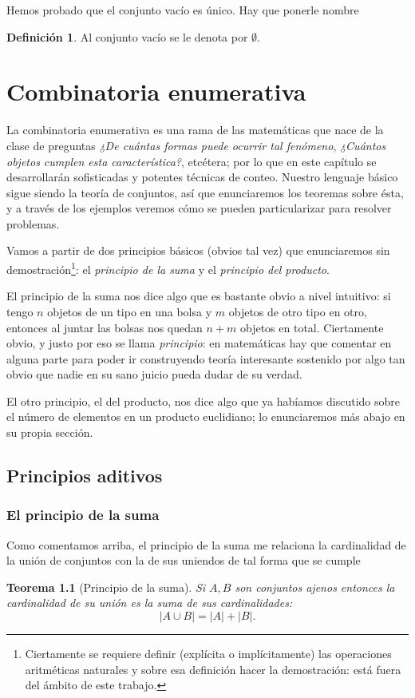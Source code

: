 \documentclass{book}
\newtheorem{thm}{Teorema}[chapter]
\theoremstyle{definition}
\newtheorem{df}{Definición}[chapter]
\begin{document}
Hemos probado que el conjunto vacío es único. Hay que ponerle nombre
\begin{df}
	Al conjunto vacío se le denota por $\emptyset$.
\end{df}

\chapter{Combinatoria enumerativa}
\label{ch_combinatoriaEnumerativa}
La combinatoria enumerativa es una rama de las matemáticas que nace de la clase de preguntas \emph{¿De cuántas formas puede ocurrir tal fenómeno}, \emph{¿Cuántos objetos cumplen esta característica?}, etcétera; por lo que en este capítulo se desarrollarán  sofisticadas y potentes técnicas de conteo. Nuestro lenguaje básico sigue siendo la teoría de conjuntos, así que enunciaremos los teoremas sobre ésta, y a través de los ejemplos veremos cómo se pueden particularizar para resolver problemas.

Vamos a partir de dos principios básicos (obvios tal vez) que enunciaremos sin demostración\footnote{Ciertamente se requiere definir (explícita o implícitamente) las operaciones aritméticas naturales y sobre esa definición hacer la demostración: está fuera del ámbito de este trabajo.}: el \emph{principio de la suma} y el \emph{principio del producto}.

El principio de la suma nos dice algo que es bastante obvio a nivel intuitivo: si tengo $n$ objetos de un tipo en una bolsa y $m$ objetos de otro tipo en otro, entonces al juntar las bolsas nos quedan $n+m$ objetos en total.
Ciertamente obvio, y justo por eso se llama \emph{principio}: en matemáticas hay que comentar en alguna parte para poder ir construyendo teoría interesante sostenido por algo tan obvio que nadie en su sano juicio pueda dudar de su verdad.

El otro principio, el del producto, nos dice algo que ya habíamos discutido %
sobre el número de elementos en un producto euclidiano; lo enunciaremos más abajo en su propia sección.

\section{Principios aditivos}
\subsection{El principio de la suma}
Como comentamos arriba, el principio de la suma me relaciona la cardinalidad de la unión de conjuntos con la de sus uniendos de tal forma que se cumple
\begin{thm}[Principio de la suma]
	Si $A,B$ son conjuntos ajenos %
	entonces la cardinalidad de su unión es la suma de sus cardinalidades:
	\[\left|A\cup B\right| = \left| A \right| +\left| B \right|.\]
\end{thm}
\end{document}
